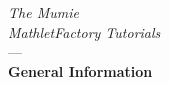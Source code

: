 \documentclass[a4paper,12pt]{article}
\begin{document}
\begin{titlepage}
\begin{center}

\vspace*{1cm}

\Large{\textit{The Mumie\\MathletFactory Tutorials}}\\[1cm] ---\\[1cm]
\huge{\textbf{General Information}}\\[14cm]

\end{center}
\end{titlepage}

\newpage

\tableofcontents 

\newpage



\end{document}
